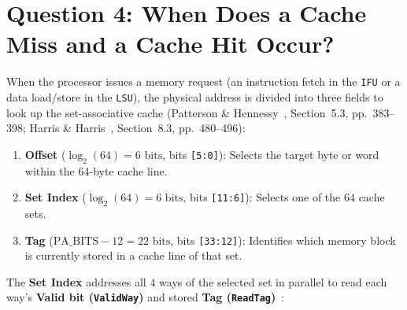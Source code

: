\documentclass[11pt,a4paper]{article}
\begin{document}

\section{Question 4: When Does a Cache Miss and a Cache Hit Occur?}

When the processor issues a memory request (an instruction fetch in the \texttt{IFU} or a data load/store in the \texttt{LSU}), the physical address is divided into three fields to look up the set-associative cache (Patterson \& Hennessy~\cite{patterson2020}, Section~5.3, pp.~383--398; Harris \& Harris~\cite{harris2021}, Section~8.3, pp.~480--496):
\begin{enumerate}[leftmargin=1.5em, itemsep=2.5pt, topsep=2pt]
    \item \textbf{Offset} ($\log_2(64) = 6\text{ bits}$, bits \texttt{[5:0]}): Selects the target byte or word within the 64-byte cache line.
    \item \textbf{Set Index} ($\log_2(64) = 6\text{ bits}$, bits \texttt{[11:6]}): Selects one of the $64$ cache sets.
    \item \textbf{Tag} ($\text{PA\_BITS} - 12 = 22\text{ bits}$, bits \texttt{[33:12]}): Identifies which memory block is currently stored in a cache line of that set.
\end{enumerate}
The \textbf{Set Index} addresses all $4$ ways of the selected set in parallel to read each way's \textbf{Valid bit (\texttt{ValidWay})} and stored \textbf{Tag (\texttt{ReadTag})}~\cite{patterson2020,harris2021}:
\end{document}

